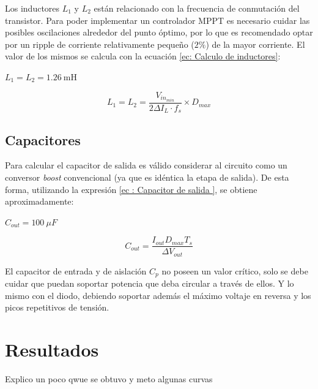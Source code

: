             Los inductores $L_1$ y $L_2$ están relacionado con la frecuencia de conmutación del transistor. Para poder implementar un controlador MPPT es necesario cuidar las posibles oscilaciones alrededor del punto óptimo, por lo que es recomendado optar por un ripple de corriente relativamente pequeño \cite{atia2009photovoltaic} ($2\%$) de la mayor corriente. El valor de los mismos se calcula con la ecuación \ref{ec: Calculo de inductores}: 
            
            $L_1 = L_2 = 1.26~\mathrm{mH}$
            
            \begin{equation}
                L_1 = L_2 = \frac{V_{in_{min}}}{2\Delta I_L \cdot f_s} \times D_{max} 
                \label{ec: Calculo de inductores}
            \end{equation}
    
        \subsection{Capacitores}
            
            Para calcular el capacitor de salida es válido considerar al circuito como un conversor \textit{boost} convencional (ya que es idéntica la etapa de salida). De esta forma, utilizando la expresión \ref{ec : Capacitor de salida }\cite{falin2008designing}, se obtiene aproximadamente: 
            
            $C_{out} = 100~\mu F$
            
            \begin{equation}
                C_{out} = \frac{I_{out}D_{max}T_s}{\Delta V_{out}}
                \label{ec : Capacitor de salida }
            \end{equation}
        
            El capacitor de entrada y de aislación $C_p$ no poseen un valor crítico, solo se debe cuidar que puedan soportar potencia que deba circular a través de ellos. Y lo mismo con el diodo, debiendo soportar además el máximo voltaje en reversa y los picos repetitivos de tensión.
        
        
        
\section{Resultados}
 
    Explico un poco qwue se obtuvo y meto algunas curvas 
    
